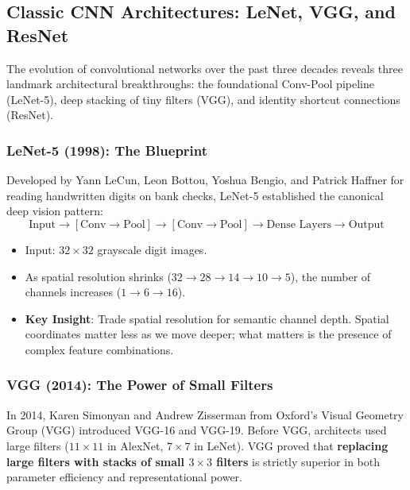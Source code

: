 \subsection{Classic CNN Architectures: LeNet, VGG, and ResNet}\label{subsec:architectures}

The evolution of convolutional networks over the past three decades reveals three landmark architectural breakthroughs: the foundational Conv-Pool pipeline (LeNet-5), deep stacking of tiny filters (VGG), and identity shortcut connections (ResNet).

\subsubsection{LeNet-5 (1998): The Blueprint}
Developed by Yann LeCun, Leon Bottou, Yoshua Bengio, and Patrick Haffner for reading handwritten digits on bank checks, LeNet-5 established the canonical deep vision pattern:
\begin{equation*}
\text{Input} \longrightarrow [\text{Conv} \to \text{Pool}] \longrightarrow [\text{Conv} \to \text{Pool}] \longrightarrow \text{Dense Layers} \longrightarrow \text{Output}
\end{equation*}
\begin{itemize}
    \item Input: $32 \times 32$ grayscale digit images.
    \item As spatial resolution shrinks ($32 \to 28 \to 14 \to 10 \to 5$), the number of channels increases ($1 \to 6 \to 16$).
    \item \textbf{Key Insight}: Trade spatial resolution for semantic channel depth. Spatial coordinates matter less as we move deeper; what matters is the presence of complex feature combinations.
\end{itemize}

\subsubsection{VGG (2014): The Power of Small Filters}
In 2014, Karen Simonyan and Andrew Zisserman from Oxford's Visual Geometry Group (VGG) introduced VGG-16 and VGG-19. Before VGG, architects used large filters ($11 \times 11$ in AlexNet, $7 \times 7$ in LeNet). VGG proved that \textbf{replacing large filters with stacks of small $3 \times 3$ filters} is strictly superior in both parameter efficiency and representational power.

